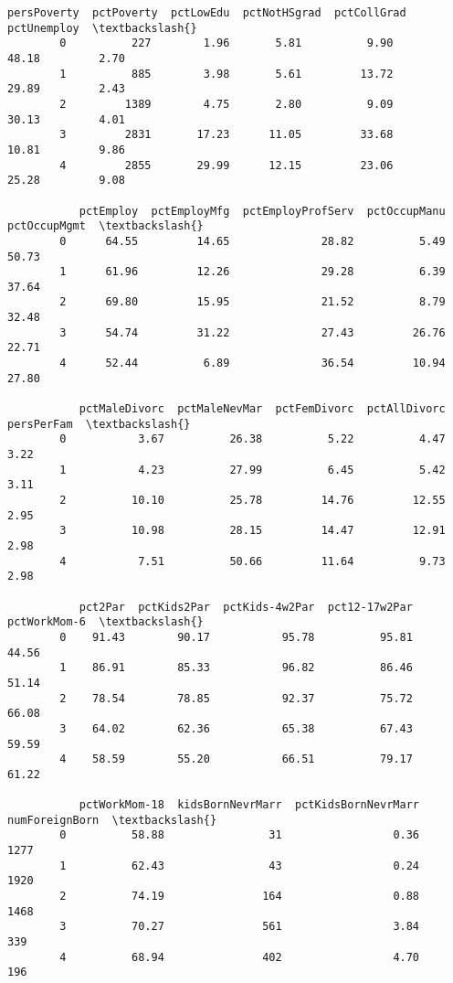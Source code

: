 \documentclass[11pt]{llncs}
\begin{document}
\begin{Verbatim}[commandchars=\\\{\}]
           persPoverty  pctPoverty  pctLowEdu  pctNotHSgrad  pctCollGrad  pctUnemploy  \textbackslash{}
        0          227        1.96       5.81          9.90        48.18         2.70   
        1          885        3.98       5.61         13.72        29.89         2.43   
        2         1389        4.75       2.80          9.09        30.13         4.01   
        3         2831       17.23      11.05         33.68        10.81         9.86   
        4         2855       29.99      12.15         23.06        25.28         9.08   
        
           pctEmploy  pctEmployMfg  pctEmployProfServ  pctOccupManu  pctOccupMgmt  \textbackslash{}
        0      64.55         14.65              28.82          5.49         50.73   
        1      61.96         12.26              29.28          6.39         37.64   
        2      69.80         15.95              21.52          8.79         32.48   
        3      54.74         31.22              27.43         26.76         22.71   
        4      52.44          6.89              36.54         10.94         27.80   
        
           pctMaleDivorc  pctMaleNevMar  pctFemDivorc  pctAllDivorc  persPerFam  \textbackslash{}
        0           3.67          26.38          5.22          4.47        3.22   
        1           4.23          27.99          6.45          5.42        3.11   
        2          10.10          25.78         14.76         12.55        2.95   
        3          10.98          28.15         14.47         12.91        2.98   
        4           7.51          50.66         11.64          9.73        2.98   
        
           pct2Par  pctKids2Par  pctKids-4w2Par  pct12-17w2Par  pctWorkMom-6  \textbackslash{}
        0    91.43        90.17           95.78          95.81         44.56   
        1    86.91        85.33           96.82          86.46         51.14   
        2    78.54        78.85           92.37          75.72         66.08   
        3    64.02        62.36           65.38          67.43         59.59   
        4    58.59        55.20           66.51          79.17         61.22   
        
           pctWorkMom-18  kidsBornNevrMarr  pctKidsBornNevrMarr  numForeignBorn  \textbackslash{}
        0          58.88                31                 0.36            1277   
        1          62.43                43                 0.24            1920   
        2          74.19               164                 0.88            1468   
        3          70.27               561                 3.84             339   
        4          68.94               402                 4.70             196   
        

\end{Verbatim}
\end{document}
